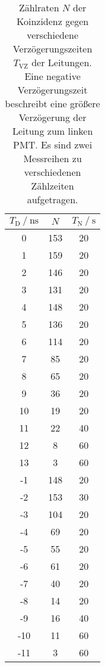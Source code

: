 \begin{table}
    \tiny
    \centering
    \caption{Zählraten $N$ der Koinzidenz gegen verschiedene Verzögerungszeiten $T_\text{VZ}$ der Leitungen. Eine negative Verzögerungszeit beschreibt eine größere Verzögerung der Leitung zum linken PMT.
    Es sind zwei Messreihen zu verschiedenen Zählzeiten aufgetragen.}
    \label{tab:Mess1}
    \begin{tabular}{c c c}
      \toprule
      {$ T_\text{D} \mathbin{/} \unit{\nano\second}$} & {$N$} & {$T_\mathrm{N} \mathbin{/} \unit{\second}$} \\
      \midrule
    0  & 153 & 20 \\
    1  & 159 & 20 \\
    2  & 146 & 20 \\
    3  & 131 & 20 \\
    4  & 148 & 20 \\
    5  & 136 & 20 \\
    6  & 114 & 20 \\
    7  & 85 & 20 \\
    8  & 65 & 20 \\
    9  & 36 & 20 \\
    10 & 19 & 20 \\
    11 & 22 & 40 \\
    12 & 8  & 60 \\
    13 & 3  & 60 \\
    -1 & 148 & 20 \\
    -2 & 153 & 30 \\
    -3 & 104 & 20 \\
    -4 & 69 & 20 \\
    -5 & 55 & 20 \\
    -6 & 61 & 20 \\
    -7 & 40 & 20 \\
    -8 & 14 & 20 \\
    -9 & 16 & 40 \\
    -10& 11 & 60 \\
    -11& 3 & 60 \\
    \bottomrule
    \end{tabular}
\end{table}
